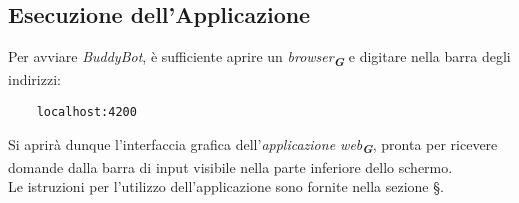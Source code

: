 \subsection{Esecuzione dell'Applicazione}
Per avviare \emph{BuddyBot}, è sufficiente aprire un \emph{browser}\textsubscript{\textbf{\textit{G}}} e digitare nella barra
degli indirizzi:
\begin{verbatim}
    localhost:4200
\end{verbatim}
Si aprirà dunque l'interfaccia grafica dell'\emph{applicazione web}\textsubscript{\textbf{\textit{G}}}, pronta per ricevere domande
dalla barra di input visibile nella parte inferiore dello schermo.\\
Le istruzioni per l'utilizzo dell'applicazione sono fornite nella sezione \S{}.
